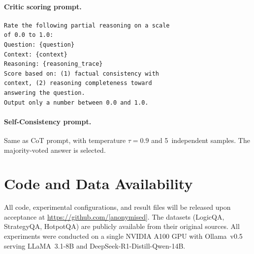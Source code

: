 \documentclass[11pt]{article}
\begin{document}
\paragraph{Critic scoring prompt.}
\begin{verbatim}
Rate the following partial reasoning on a scale
of 0.0 to 1.0:
Question: {question}
Context: {context}
Reasoning: {reasoning_trace}
Score based on: (1) factual consistency with
context, (2) reasoning completeness toward
answering the question.
Output only a number between 0.0 and 1.0.
\end{verbatim}

\paragraph{Self-Consistency prompt.}
Same as CoT prompt, with temperature $\tau = 0.9$ and 5~independent samples. The majority-voted answer is selected.

\section{Code and Data Availability}
\label{app:code}

All code, experimental configurations, and result files will be released upon acceptance at \url{https://github.com/[anonymised]}. The datasets (LogicQA, StrategyQA, HotpotQA) are publicly available from their original sources. All experiments were conducted on a single NVIDIA A100 GPU with Ollama~v0.5 serving LLaMA~3.1-8B and DeepSeek-R1-Distill-Qwen-14B.
\end{document}
